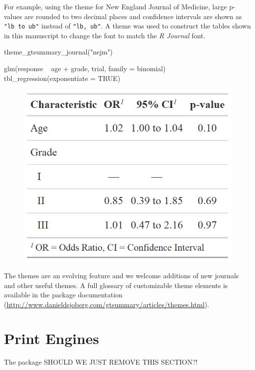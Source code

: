 For example, using the theme for New England Journal of Medicine, large p-values are rounded to two decimal places and confidence intervals are shown as \texttt{"lb to ub"} instead of \texttt{"lb, ub"}. A theme was used to construct the tables shown in this manuscript to change the font to match the \emph{R Journal} font.

\begin{example}
theme_gtsummary_journal("nejm")

glm(response ~ age + grade, trial, family = binomial) %
  tbl_regression(exponentiate = TRUE)
\end{example}

\begin{figure}[h!]
  \includegraphics[scale=0.28]{nejm.png}
  \centering
\end{figure}

The themes are an evolving feature and we welcome additions of new journals and other useful themes.
A full glossary of customizable theme elements is available in the package documentation (\url{http://www.danieldsjoberg.com/gtsummary/articles/themes.html}).

\section{Print Engines}

The  package 
SHOULD WE JUST REMOVE THIS SECTION?!

